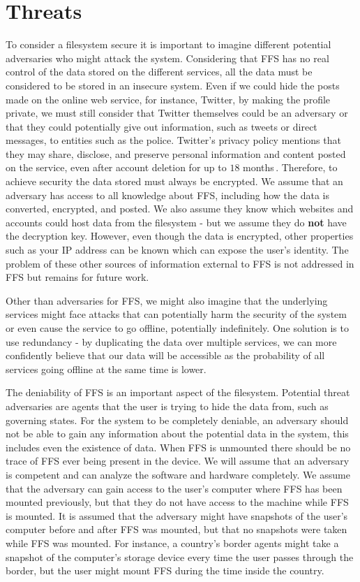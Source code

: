 \section{Threats}
To consider a filesystem secure it is important to imagine different potential adversaries who might attack the system. Considering that \gls{FFS} has no real control of the data stored on the different services, all the data must be considered to be stored in an insecure system. Even if we could hide the posts made on the online web service, for instance, Twitter, by making the profile private, we must still consider that Twitter themselves could be an adversary or that they could potentially give out information, such as tweets or direct messages, to entities such as the police. Twitter's privacy policy mentions that they may share, disclose, and preserve personal information and content posted on the service, even after account deletion for up to $18$ months\,\cite{TwitterPrivacyPolicy}. Therefore, to achieve security the data stored must always be encrypted. We assume that an adversary has access to all knowledge about \gls{FFS}, including how the data is converted, encrypted, and posted. We also assume they know which websites and accounts could host data from the filesystem - but we assume they do \textbf{not} have the decryption key. However, even though the data is encrypted, other properties such as your IP address can be known which can expose the user's identity. The problem of these other sources of information external to \gls{FFS} is not addressed in \gls{FFS} but remains for future work.

Other than adversaries for \gls{FFS}, we might also imagine that the underlying services might face attacks that can potentially harm the security of the system or even cause the service to go offline, potentially indefinitely. One solution is to use redundancy - by duplicating the data over multiple services, we can more confidently believe that our data will be accessible as the probability of all services going offline at the same time is lower.

The deniability of \gls{FFS} is an important aspect of the filesystem. Potential threat adversaries are agents that the user is trying to hide the data from, such as governing states. For the system to be completely deniable, an adversary should not be able to gain any information about the potential data in the system, this includes even the existence of data. When \gls{FFS} is unmounted there should be no trace of \gls{FFS} ever being present in the device. We will assume that an adversary is competent and can analyze the software and hardware completely. We assume that the adversary can gain access to the user's computer where \gls{FFS} has been mounted previously, but that they do not have access to the machine while \gls{FFS} is mounted. It is assumed that the adversary might have snapshots of the user's computer before and after \gls{FFS} was mounted, but that no snapshots were taken while \gls{FFS} was mounted. For instance, a country's border agents might take a snapshot of the computer's storage device every time the user passes through the border, but the user might mount \gls{FFS} during the time inside the country.